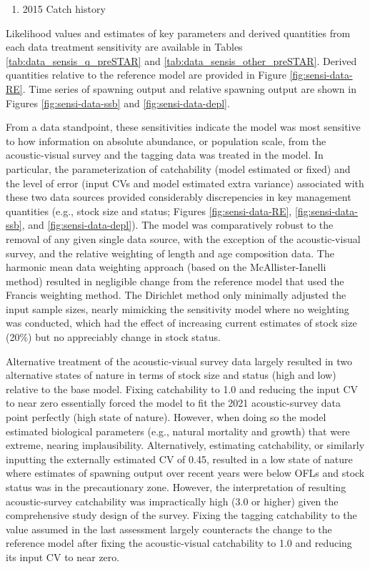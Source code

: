 \documentclass[11pt,
  english,
  letterpaper,
]{article}
\providecommand{\tightlist}{%
  \setlength{\itemsep}{0pt}\setlength{\parskip}{0pt}}
\providecommand{\tightlist}{%
  \setlength{\itemsep}{0pt}\setlength{\parskip}{0pt}}
\begin{document}
\begin{enumerate}
\def\labelenumi{\arabic{enumi}.}
\setcounter{enumi}{16}
\tightlist
\item
  2015 Catch history
\end{enumerate}

Likelihood values and estimates of key parameters and derived quantities from each data treatment sensitivity are available in Tables \ref{tab:data_sensis_q_preSTAR} and \ref{tab:data_sensis_other_preSTAR}. Derived quantities relative to the reference model are provided in Figure \ref{fig:sensi-data-RE}. Time series of spawning output and relative spawning output are shown in Figures \ref{fig:sensi-data-ssb} and \ref{fig:sensi-data-depl}.

From a data standpoint, these sensitivities indicate the model was most sensitive to how information on absolute abundance, or population scale, from the acoustic-visual survey and the tagging data was treated in the model. In particular, the parameterization of catchability (model estimated or fixed) and the level of error (input CVs and model estimated extra variance) associated with these two data sources provided considerably discrepencies in key management quantities (e.g., stock size and status; Figures \ref{fig:sensi-data-RE}, \ref{fig:sensi-data-ssb}, and \ref{fig:sensi-data-depl}). The model was comparatively robust to the removal of any given single data source, with the exception of the acoustic-visual survey, and the relative weighting of length and age composition data. The harmonic mean data weighting approach (based on the McAllister-Ianelli method) resulted in negligible change from the reference model that used the Francis weighting method. The Dirichlet method only minimally adjusted the input sample sizes, nearly mimicking the sensitivity model where no weighting was conducted, which had the effect of increasing current estimates of stock size (20\%) but no appreciably change in stock status.

Alternative treatment of the acoustic-visual survey data largely resulted in two alternative states of nature in terms of stock size and status (high and low) relative to the base model. Fixing catchability to 1.0 and reducing the input CV to near zero essentially forced the model to fit the 2021 acoustic-survey data point perfectly (high state of nature). However, when doing so the model estimated biological parameters (e.g., natural mortality and growth) that were extreme, nearing implausibility. Alternatively, estimating catchability, or similarly inputting the externally estimated CV of 0.45, resulted in a low state of nature where estimates of spawning output over recent years were below OFLs and stock status was in the precautionary zone. However, the interpretation of resulting acoustic-survey catchability was impractically high (3.0 or higher) given the comprehensive study design of the survey. Fixing the tagging catchability to the value assumed in the last assessment largely counteracts the change to the reference model after fixing the acoustic-visual catchability to 1.0 and reducing its input CV to near zero.
\end{document}
